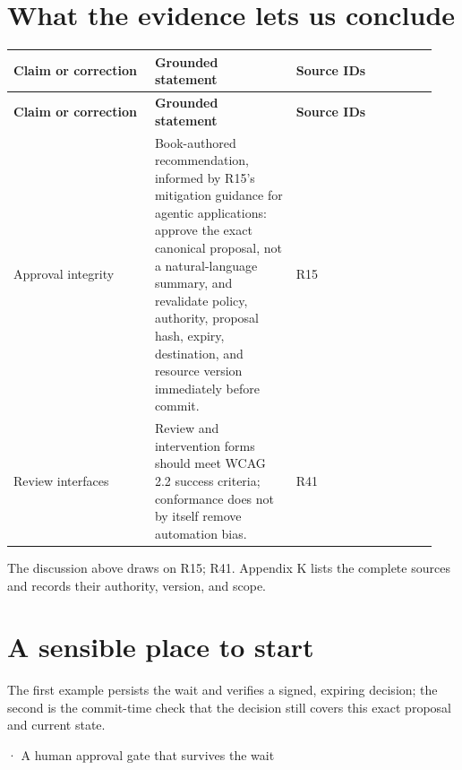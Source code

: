 \section{What the evidence lets us conclude}

\BookTableStart
\small
\begin{longtable}{@{}Y{0.3133\linewidth}Y{0.3133\linewidth}Y{0.3133\linewidth}@{}}
\color{white}\bfseries \textbf{Claim or correction} & \color{white}\bfseries \textbf{Grounded statement} & \color{white}\bfseries \textbf{Source IDs} \\
\endfirsthead
{}
\color{white}\bfseries \textbf{Claim or correction} & \color{white}\bfseries \textbf{Grounded statement} & \color{white}\bfseries \textbf{Source IDs} \\
\endhead
Approval integrity & Book-authored recommendation, informed by R15's mitigation guidance for agentic applications: approve the exact canonical proposal, not a natural-language summary, and revalidate policy, authority, proposal hash, expiry, destination, and resource version immediately before commit. & R15 \\
Review interfaces & Review and intervention forms should meet WCAG 2.2 success criteria; conformance does not by itself remove automation bias. & R41 \\
\end{longtable}
\BookTableEnd

The discussion above draws on R15; R41. Appendix K lists the complete sources and records their authority, version, and scope.\par

\section{A sensible place to start}

The first example persists the wait and verifies a signed, expiring decision; the second is the commit-time check that the decision still covers this exact proposal and current state.\par

\BookSnake · A human approval gate that survives the wait\par

